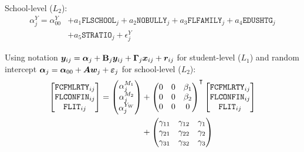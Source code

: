 \documentclass[a4paper,11pt,UKenglish,twoside,openright]{report}\usepackage[]{graphicx}\usepackage[]{color}
\begin{document}
School-level ($L_2$):
\begin{equation}
    \begin{aligned}
        \alpha^{Y}_{j} = \alpha^Y_{00} &+ a_1\texttt{FLSCHOOL}_j + a_2\texttt{NOBULLY}_j + a_3\texttt{FLFAMILY}_j + a_4\texttt{EDUSHTG}_j\\
        &+ a_5\texttt{STRATIO}_j + \epsilon^{Y}_j
    \end{aligned}
\end{equation}

\newpage

Using  notation $\boldsymbol{y}_{ij} = \boldsymbol{\alpha}_j + \boldsymbol{\mathrm{B}}_j\boldsymbol{y}_{ij} + \boldsymbol{\Gamma}_j\boldsymbol{x}_{ij} + \boldsymbol{r}_{ij}$ for student-level ($L_1$) and random intercept $\boldsymbol{\alpha}_{j} = \boldsymbol{\alpha}_{00} + \boldsymbol{A}\boldsymbol{w}_j + \boldsymbol{\varepsilon}_j$ for school-level ($L_2$):
\begin{equation}
    \begin{aligned}
        \begin{bmatrix}
            \texttt{FCFMLRTY}_{ij}\\
            \texttt{FLCONFIN}_{ij}\\
            \texttt{FLIT}_{ij}
        \end{bmatrix} =
        \begin{pmatrix}
            \alpha^{M_1}_{j}\\
            \alpha^{M_2}_{j}\\
            \alpha^{Y_W}_{j}\\
        \end{pmatrix} &+
        \begin{pmatrix}
            0   &0  &\beta_1\\
            0   &0  &\beta_2\\
            0   &0  &0\\
        \end{pmatrix}\Ts
        \begin{bmatrix}
            \texttt{FCFMLRTY}_{ij}\\
            \texttt{FLCONFIN}_{ij}\\
            \texttt{FLIT}_{ij}
        \end{bmatrix}\\
        &+
        \begin{pmatrix}
            \gamma_{11}  &\gamma_{12}   &\gamma_1\\
            \gamma_{21}  &\gamma_{22}   &\gamma_2\\
            \gamma_{31}  &\gamma_{32}   &\gamma_3\\

\end{pmatrix}
\end{aligned}
\end{equation}
\end{document}
